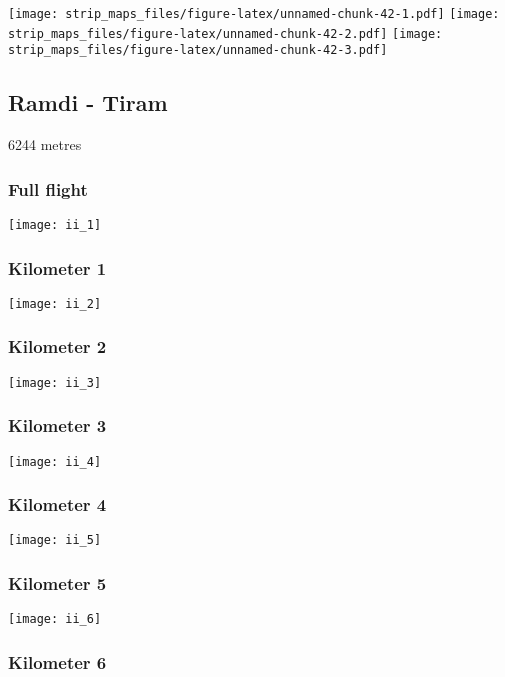 \documentclass[]{article}
\begin{document}
\texttt{[image: strip\_maps\_files/figure-latex/unnamed-chunk-42-1.pdf]}
\texttt{[image: strip\_maps\_files/figure-latex/unnamed-chunk-42-2.pdf]}
\texttt{[image: strip\_maps\_files/figure-latex/unnamed-chunk-42-3.pdf]}

\newpage

\subsection{Ramdi - Tiram}\label{ramdi---tiram}

6244 metres

\subsubsection{Full flight}\label{full-flight-34}

\texttt{[image: ii\_1]}

\subsubsection{Kilometer 1}\label{kilometer-1-34}

\texttt{[image: ii\_2]}

\subsubsection{Kilometer 2}\label{kilometer-2-34}

\texttt{[image: ii\_3]}

\subsubsection{Kilometer 3}\label{kilometer-3-34}

\texttt{[image: ii\_4]}

\subsubsection{Kilometer 4}\label{kilometer-4-33}

\texttt{[image: ii\_5]}

\subsubsection{Kilometer 5}\label{kilometer-5-28}

\texttt{[image: ii\_6]}

\subsubsection{Kilometer 6}\label{kilometer-6-23}
\end{document}
